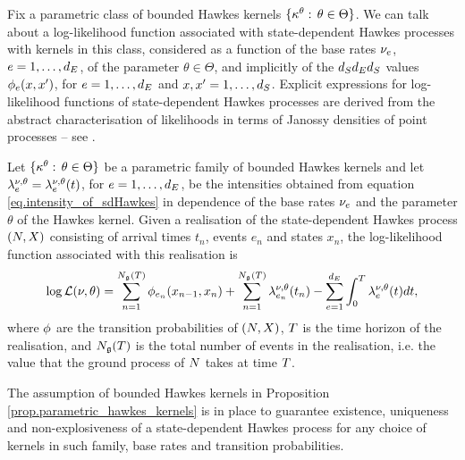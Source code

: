 \documentclass[10pt, article,table]{article}
\begin{document}
Fix a parametric class of bounded Hawkes kernels $\lbrace\hawkesKernel^\theta : \, \theta \in \Theta \rbrace$. We can talk about a log-likelihood function associated with state-dependent Hawkes processes with kernels in this class, considered as a function of the base rates $\baseRate_e$, $e=1,\dots,\numEventTypes$, of the parameter $\theta \in \Theta$, and implicitly of the $\numStates\numEventTypes\numStates$ values $\transProb_{e}(x,\xone)$, for $e=1,\dots,\numEventTypes$ and $x,\xone=1,\dots,\numStates$. Explicit expressions for log-likelihood functions of state-dependent Hawkes processes are derived from the abstract characterisation of likelihoods in terms of Janossy densities of point processes -- see \citealp[Chapters 7 and 14]{DVJ08int}.
\begin{prop}
 Let $\lbrace\hawkesKernel^\theta : \, \theta \in \Theta \rbrace$ be a parametric family of bounded Hawkes kernels and let $\intensity^{\baseRate,\theta}=\intensity^{\baseRate,\theta}(t)$, for $e=1,\dots, \numEventTypes$, be the intensities obtained from equation \eqref{eq.intensity_of_sdHawkes} in dependence of the base rates $\baseRate_e$ and the parameter $\theta$ of the Hawkes kernel.  Given a realisation of the state-dependent Hawkes process $(\multiCountingProc, \stateVariable)$ consisting of arrival times $t_n$, events $e_n$ and states $x_n$, the log-likelihood function associated with this realisation is 
 \begin{equation}\label{eq.loglikelihood_general}
  \log \likelihood (\nu,\theta) 
  =
  \sum_{n=1}^{\groundProc(\timeHorizon)} \transProb_{e_n}(x_{n-1},x_{n})
  +\sum_{n=1}^{\groundProc(\timeHorizon)} \intensity[e_{n}]^{\baseRate,\theta}(t_n)
  -\sum_{e=1}^{\numEventTypes} \int_{0}^{\timeHorizon} \intensity^{\baseRate,\theta}(t)dt, 
 \end{equation}
where $\transProb$ are the transition probabilities of $(\multiCountingProc, \stateVariable)$, $\timeHorizon$ is the time horizon of the realisation, and $\groundProc(\timeHorizon)$ is the total number of events in the realisation, i.e. the value that the ground process of  $\multiCountingProc$ takes at time $\timeHorizon$. 
\end{prop}
The assumption of bounded Hawkes kernels in Proposition \ref{prop.parametric_hawkes_kernels} is in place to guarantee existence, uniqueness and non-explosiveness of a state-dependent Hawkes process for any choice of kernels in such family, base rates and transition probabilities.  
\end{document}
